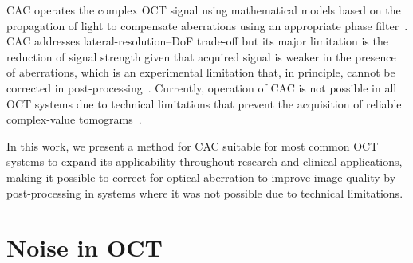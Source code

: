 CAC operates the complex OCT signal using mathematical models based on the propagation of light to compensate aberrations using an appropriate phase filter~\cite{Ralston2006_Interferometric, Yasuno2006_Noniterative, Adie2012_Computational}. CAC addresses lateral-resolution--DoF trade-off but its major limitation is the reduction of signal strength given that acquired signal is weaker in the presence of aberrations, which is an experimental limitation that, in principle, cannot be corrected in post-processing~\cite{Wu2019_Computed}. Currently, operation of CAC is not possible in all OCT systems due to technical limitations that prevent the acquisition of reliable complex-value tomograms~\cite{Shemonski2014_Stability}.

In this work, we present a method for CAC suitable for most common OCT systems to expand its applicability throughout research and clinical applications, making it possible to correct for optical aberration to improve image quality by post-processing in systems where it was not possible due to technical limitations.

\section{Noise in OCT}

